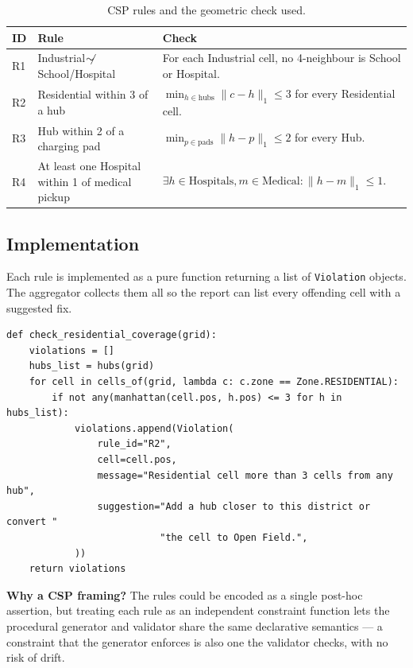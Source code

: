 \documentclass[11pt,a4paper]{article}
\begin{document}
\begin{table}[H]
\centering
\caption{CSP rules and the geometric check used.}
\begin{tabular}{@{}llp{8.5cm}@{}}
\toprule
\textbf{ID} & \textbf{Rule} & \textbf{Check} \\
\midrule
R1 & Industrial $\not\!\!\sim$ School/Hospital   & For each Industrial cell, no 4-neighbour is School or Hospital. \\
R2 & Residential within 3 of a hub              & $\min_{h\in\text{hubs}} \|c-h\|_1 \leq 3$ for every Residential cell. \\
R3 & Hub within 2 of a charging pad             & $\min_{p\in\text{pads}} \|h-p\|_1 \leq 2$ for every Hub. \\
R4 & At least one Hospital within 1 of medical pickup & $\exists h \in \text{Hospitals}, m \in \text{Medical}: \|h-m\|_1 \leq 1$. \\
\bottomrule
\end{tabular}
\end{table}

\subsection{Implementation}
Each rule is implemented as a pure function returning a list of
\texttt{Violation} objects. The aggregator collects them all so the
report can list every offending cell with a suggested fix.

\begin{lstlisting}[style=py]
def check_residential_coverage(grid):
    violations = []
    hubs_list = hubs(grid)
    for cell in cells_of(grid, lambda c: c.zone == Zone.RESIDENTIAL):
        if not any(manhattan(cell.pos, h.pos) <= 3 for h in hubs_list):
            violations.append(Violation(
                rule_id="R2",
                cell=cell.pos,
                message="Residential cell more than 3 cells from any hub",
                suggestion="Add a hub closer to this district or convert "
                           "the cell to Open Field.",
            ))
    return violations
\end{lstlisting}

\begin{notebox}
\textbf{Why a CSP framing?} The rules could be encoded as a single
post-hoc assertion, but treating each rule as an independent constraint
function lets the procedural generator and validator share the same
declarative semantics --- a constraint that the generator enforces is
also one the validator checks, with no risk of drift.
\end{notebox}
\end{document}
